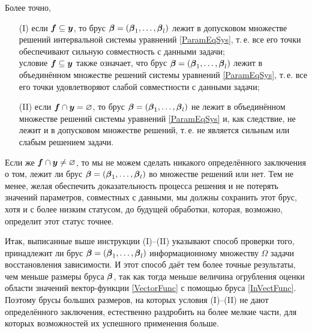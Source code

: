 \documentclass[a5paper,openany]{book}
\newcommand{\mbf}[1]{\protect\text{\boldmath$#1$}}
\begin{document}
Более точно, 
\begin{itemize} 
\item[(I)]  
если $\mbf{f}\subseteq\mbf{y}$, то брус $\mbf{\beta} = (\mbf{\beta}_{1}, \ldots, 
\mbf{\beta}_{l})$ лежит в допусковом множестве решений интервальной системы уравнений 
\eqref{ParamEqSys}, т.\,е. все его точки обеспечивают сильную совместность с данными 
задачи; \\[2mm]  
условие $\mbf{f}\subseteq\mbf{y}$ также означает, что брус $\mbf{\beta} = 
(\mbf{\beta}_{1}, \ldots, \mbf{\beta}_{l})$ лежит в объединённом множестве решений 
системы уравнений \eqref{ParamEqSys}, т.\,е. все его точки удовлетворяют слабой 
совместности с данными задачи; 
\item[(II)]  
если $\mbf{f}\cap\mbf{y} = \varnothing$, то брус $\mbf{\beta} = (\mbf{\beta}_{1}, 
\ldots, \mbf{\beta}_{l})$ не лежит в объединённом множестве решений системы уравнений  
\eqref{ParamEqSys} и, как следствие, не лежит и в допусковом множестве решений, т.\,е. 
не является сильным или слабым решением задачи. 
\end{itemize} 
Если же $\mbf{f}\cap\mbf{y}\neq\varnothing$, то мы не можем сделать никакого 
определённого заключения о том, лежит ли брус $\mbf{\beta} = (\mbf{\beta}_{1}, \ldots, 
\mbf{\beta}_{l})$ во множестве решений или нет. Тем не менее, желая обеспечить 
доказательность процесса решения и не потерять значений параметров, совместных 
с данными, мы должны сохранить этот брус, хотя и с более низким статусом, до будущей 
обработки, которая, возможно, определит этот статус точнее. 
  
Итак, выписанные выше инструкции (I)--(II) указывают способ проверки того, принадлежит 
ли брус $\mbf{\beta} = (\mbf{\beta}_{1}, \ldots, \mbf{\beta}_{l})$ информационному 
множеству $\varOmega$ задачи восстановления зависимости. И этот способ даёт тем 
более точные результаты, чем меньше размеры бруса $\mbf{\beta}$, так как тогда меньше 
величина огрубления оценки области значений вектор-функции \eqref{VectorFunc} с помощью 
бруса \eqref{InVectFunc}. Поэтому брусы больших размеров, на которых условия (I)--(II) 
не дают определённого заключения, естественно раздробить на более мелкие части, 
для которых возможностей их успешного применения больше. 
  
  
\end{document}
